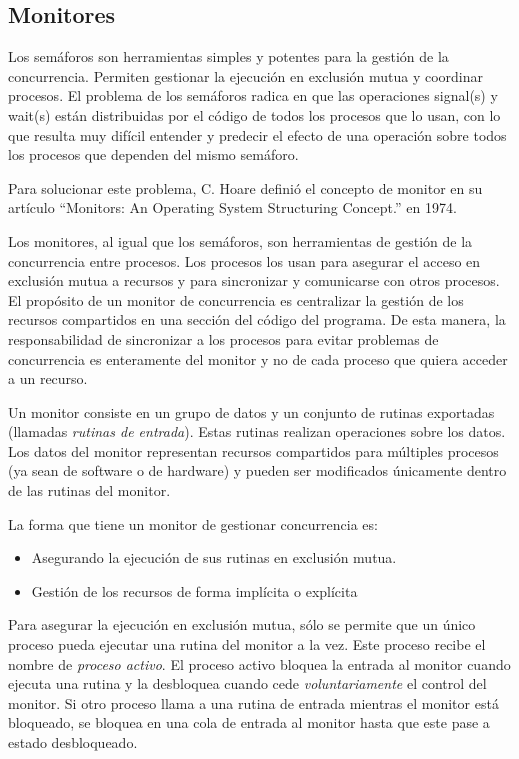 \subsection{Monitores}
\label{monitores}

Los semáforos son herramientas simples y potentes para la gestión de la
concurrencia. Permiten gestionar la ejecución en exclusión mutua y coordinar
procesos. El problema de los semáforos radica en que las operaciones signal(s)
y wait(s) están distribuidas por el código de todos los procesos que lo usan,
con lo que resulta muy difícil entender y predecir el efecto de una operación
sobre todos los procesos que dependen del mismo semáforo.

Para solucionar este problema, C. Hoare definió el concepto de monitor en su
artículo “Monitors: An Operating System Structuring Concept.” en 1974.

Los monitores, al igual que los semáforos, son herramientas de gestión de la
concurrencia entre procesos. Los procesos los usan para asegurar el acceso en
exclusión mutua a recursos y para sincronizar y comunicarse con otros
procesos.\\
El propósito de un monitor de concurrencia es centralizar la gestión de los
recursos compartidos en una sección del código del programa. De esta manera, la
responsabilidad de sincronizar a los procesos para evitar problemas de
concurrencia es enteramente del monitor y no de cada proceso que quiera acceder
a un recurso.

Un monitor consiste en un grupo de datos y un conjunto de rutinas exportadas
(llamadas \textit{rutinas de entrada}). Estas rutinas realizan operaciones sobre
los datos. Los datos del monitor representan recursos compartidos para múltiples
procesos (ya sean de software o de hardware) y pueden ser modificados
únicamente dentro de las rutinas del monitor.

La forma que tiene un monitor de gestionar concurrencia es:
\begin{itemize}
    \item Asegurando la ejecución de sus rutinas en exclusión mutua.
    \item Gestión de los recursos de forma implícita o explícita
\end{itemize}

Para asegurar la ejecución en exclusión mutua, sólo se permite que un único
proceso pueda ejecutar una rutina del monitor a la vez. Este proceso recibe el
nombre de \textit{proceso activo}. El proceso activo bloquea la entrada al
monitor cuando ejecuta una rutina y la desbloquea cuando cede
\textit{voluntariamente} el control del monitor. Si otro proceso llama a una
rutina de entrada mientras el monitor está bloqueado, se bloquea en una cola de
entrada al monitor hasta que este pase a estado desbloqueado.


